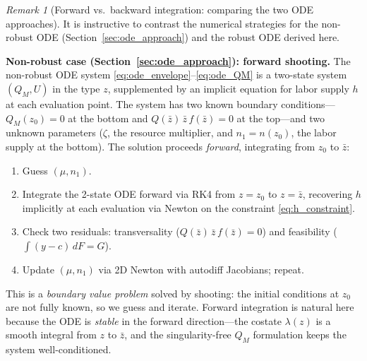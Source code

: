\documentclass[12pt,a4paper]{article}
\theoremstyle{definition}
\theoremstyle{plain}
\theoremstyle{remark}
\newtheorem{remark}{Remark}[section]
\newcommand{\zbar}{\bar{z}}
\newcommand{\zlow}{z_{\scriptscriptstyle 0}}
\begin{document}
\begin{remark}[Forward vs.\ backward integration: comparing the two ODE approaches]
\label{rem:forward_vs_backward}
It is instructive to contrast the numerical strategies for the non-robust ODE (Section~\ref{sec:ode_approach}) and the robust ODE derived here.

\medskip\noindent\textbf{Non-robust case (Section~\ref{sec:ode_approach}): forward shooting.}
The non-robust ODE system \eqref{eq:ode_envelope}--\eqref{eq:ode_QM} is a two-state system $(Q_M, U)$ in the type $z$, supplemented by an implicit equation for labor supply $h$ at each evaluation point. The system has two known boundary conditions---$Q_M(\zlow) = 0$ at the bottom and $Q(\zbar)\,\zbar\, f(\zbar) = 0$ at the top---and two unknown parameters ($\zeta$, the resource multiplier, and $n_1 = n(\zlow)$, the labor supply at the bottom). The solution proceeds \emph{forward}, integrating from $\zlow$ to $\zbar$:
\begin{enumerate}[label=(\roman*)]
\item Guess $(\mu, n_1)$.
\item Integrate the 2-state ODE forward via RK4 from $z = \zlow$ to $z = \zbar$, recovering $h$ implicitly at each evaluation via Newton on the constraint \eqref{eq:h_constraint}.
\item Check two residuals: transversality ($Q(\zbar)\,\zbar\,f(\zbar) = 0$) and feasibility ($\int (y - c)\,dF = G$).
\item Update $(\mu, n_1)$ via 2D Newton with autodiff Jacobians; repeat.
\end{enumerate}
This is a \emph{boundary value problem} solved by shooting: the initial conditions at $\zlow$ are not fully known, so we guess and iterate. Forward integration is natural here because the ODE is \emph{stable} in the forward direction---the costate $\lambda(z)$ is a smooth integral from $z$ to $\zbar$, and the singularity-free $Q_M$ formulation keeps the system well-conditioned.


\end{remark}
\end{document}
